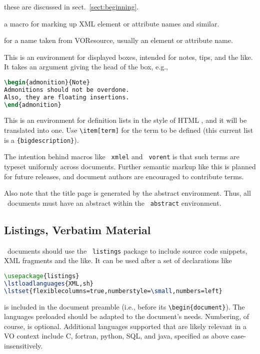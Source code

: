 \documentclass[11pt,a4paper]{ivoa}
\newcommand{\texword}[1]{\texttt{\color{texcolor} #1}}
\begin{document}
\begin{bigdescription}
\item[\texword{author}, \texword{previousversion}] these are discussed
in sect.~\ref{sect:beginning}.
\item[\texword{xmlel}] a macro for marking up XML element or attribute
names and similar.  
\item[\texword{vorent}] for a name taken from VOResource, usually an
element or attribute name.
\item[\texword{admonition}] This is an environment for 
displayed boxes, intended for notes, tips, and the like.  
It takes an argument giving the head of the box, e.g.,

\begin{lstlisting}[language=TeX]
\begin{admonition}{Note}
Admonitions should not be overdone.  
Also, they are floating insertions.
\end{admonition}
\end{lstlisting}
\item[\texword{bigdescription}] This is an environment for definition
lists in the style of HTML , and it will be translated into
one.  Use \verb|\item[term]| for the term to be defined
(this current list is a \verb|{bigdescription}|).
\end{bigdescription}

The intention behind macros like \texword{xmlel} and \texword{vorent} is
that such terms are typeset uniformly across documents.  Further
semantic markup like this is planned for future releases, and document
authors are encouraged to contribute terms.

Also note that the title page is generated by the abstract environment.
Thus, all \ivoatex\ documents must have an abstract within the
\texword{abstract} environment.

\subsection{Listings, Verbatim Material}

\ivoatex\ documents should use the \texword{listings} package to include
source code snippets, XML fragments and the like.  It can be used after
a set of declarations like
\begin{lstlisting}[language=TeX]
\usepackage{listings}
\lstloadlanguages{XML,sh}
\lstset{flexiblecolumns=true,numberstyle=\small,numbers=left}
\end{lstlisting}
is included in the document preamble (i.e., before its
\verb|\begin{document}|). The languages preloaded should be adapted to
the document's needs. Numbering, of course, is optional.  Additional
languages supported that are likely relevant in a VO context include C,
fortran, python, SQL, and java, specified as above case-insensitively.
\end{document}
